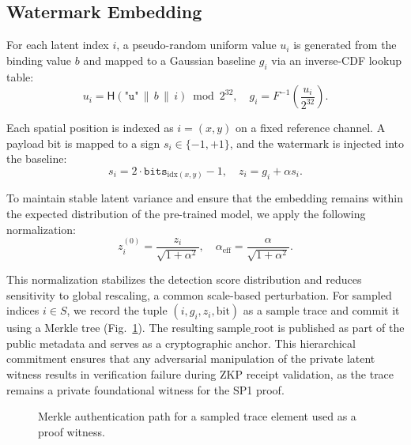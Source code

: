 \documentclass{article}
\theoremstyle{plain}
\theoremstyle{definition}
\theoremstyle{remark}
\begin{document}
\subsection{Watermark Embedding}
For each latent index \(i\), a pseudo-random uniform value \(u_i\) is generated from the
binding value \(b\) and mapped to a Gaussian baseline \(g_i\) via an inverse-CDF lookup
table:
\begin{equation}
u_i = \mathsf{H}(\texttt{"u"} \,\|\, b \,\|\, i) \bmod 2^{32},
\quad
g_i = F^{-1}\!\left( \frac{u_i}{2^{32}} \right).
\end{equation}

Each spatial position is indexed as \(i=(x,y)\) on a fixed reference channel. A payload bit
is mapped to a sign \(s_i \in \{-1,+1\}\), and the watermark is injected into the baseline:
\begin{equation}
s_i = 2 \cdot \mathtt{bits}_{\mathrm{idx}(x,y)} - 1,
\quad
z_i = g_i + \alpha s_i.
\end{equation}

To maintain stable latent variance and ensure that the embedding remains within the
expected distribution of the pre-trained model, we apply the following normalization:
\begin{equation}
z_i^{(0)} = \frac{z_i}{\sqrt{1+\alpha^2}},
\quad
\alpha_{\mathrm{eff}} = \frac{\alpha}{\sqrt{1+\alpha^2}}.
\end{equation}

This normalization stabilizes the detection score distribution and reduces sensitivity to
global rescaling, a common scale-based perturbation. For sampled indices \(i \in S\), we
record the tuple \((i, g_i, z_i, \mathrm{bit})\) as a sample trace and commit it using a Merkle
tree (Fig.~\ref{fig:merkle}). The resulting \(\mathrm{sample\_root}\) is published as part of
the public metadata and serves as a cryptographic anchor. This hierarchical commitment
ensures that any adversarial manipulation of the private latent witness results in
verification failure during ZKP receipt validation, as the trace remains a private
foundational witness for the SP1 proof.


\begin{figure}[t]
  \centering
  \caption{Merkle authentication path for a sampled trace element used as a proof witness.}
  \label{fig:merkle}
\end{figure}
\end{document}
